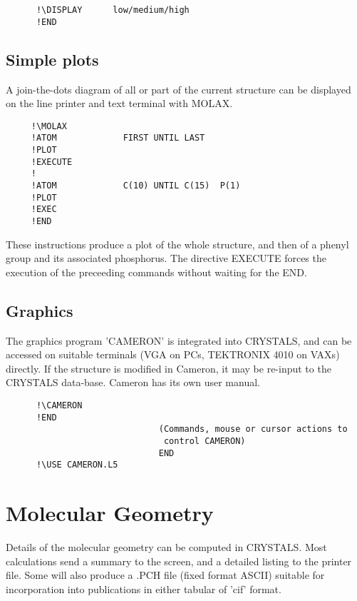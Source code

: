 \documentclass[10pt,a4paper]{report}
\begin{document}
\small\begin{verbatim}
      !\DISPLAY      low/medium/high
      !END
\end{verbatim}\normalsize





\section{Simple plots}


A join-the-dots diagram of all or part of the current structure can be
 displayed on  the line printer and text terminal with MOLAX.

\small\begin{verbatim}
     !\MOLAX
     !ATOM             FIRST UNTIL LAST
     !PLOT
     !EXECUTE
     !
     !ATOM             C(10) UNTIL C(15)  P(1)
     !PLOT
     !EXEC
     !END
\end{verbatim}\normalsize




These instructions produce a plot of the whole structure, and then of a
 phenyl group and its associated phosphorus. The directive EXECUTE forces
 the execution of the preceeding commands  without waiting for the END.




\section{Graphics}


The graphics program 'CAMERON' is integrated into CRYSTALS, and can be
 accessed on suitable terminals (VGA on PCs, TEKTRONIX 4010 on VAXs) directly.
 If the structure is modified in Cameron, it may be re-input to the CRYSTALS
 data-base. Cameron has its own user manual.

\small\begin{verbatim}
      !\CAMERON
      !END
                              (Commands, mouse or cursor actions to
                               control CAMERON)
                              END
      !\USE CAMERON.L5
\end{verbatim}\normalsize





\chapter{Molecular Geometry}


Details of the molecular geometry can be computed in CRYSTALS. Most calculations send a summary to the screen, and a detailed listing to the printer file. Some will also produce a .PCH file (fixed format ASCII) suitable for incorporation into publications in either tabular of 'cif' format.
\end{document}
